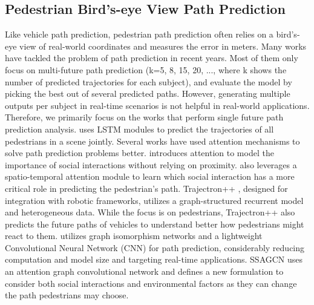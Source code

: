 \documentclass[sigconf]{acmart}
\begin{document}
\subsection{Pedestrian Bird's-eye View Path Prediction}
Like vehicle path prediction, pedestrian path prediction often relies on a bird's-eye view of real-world coordinates and measures the error in meters. Many works have tackled the problem of path prediction in recent years. Most of them only focus on multi-future path prediction \cite{yue2022human, zhou2021sliding, mangalam2021goals,wong2021view} (k=5, 8, 15, 20, ..., where k shows the number of predicted trajectories for each subject), and evaluate the model by picking the best out of several predicted paths. However, generating multiple outputs per subject in real-time scenarios is not helpful in real-world applications. Therefore, we primarily focus on the works that perform single future path prediction analysis. \cite{alahi2016social} uses LSTM modules to predict the trajectories of all pedestrians in a scene jointly. Several works have used attention mechanisms to solve path prediction problems better. \cite{vemula2017social} introduces attention to model the importance of social interactions without relying on proximity. \cite{zhao2020spatial} also leverages a spatio-temporal attention module to learn which social interaction has a more critical role in predicting the pedestrian's path. Trajectron++ \cite{salzmann2020trajectron++}, designed for integration with robotic frameworks, utilizes a graph-structured recurrent model and heterogeneous data. While the focus is on pedestrians, Trajectron++ also predicts the future paths of vehicles to understand better how pedestrians might react to them. \cite{mendieta2021carpe} utilizes graph isomorphism networks and a lightweight Convolutional Neural Network (CNN) for path prediction, considerably reducing computation and model size and targeting real-time applications. SSAGCN \cite{lv2021ssagcn} uses an attention graph convolutional network and defines a new formulation to consider both social interactions and environmental factors as they can change the path pedestrians may choose.
\end{document}
